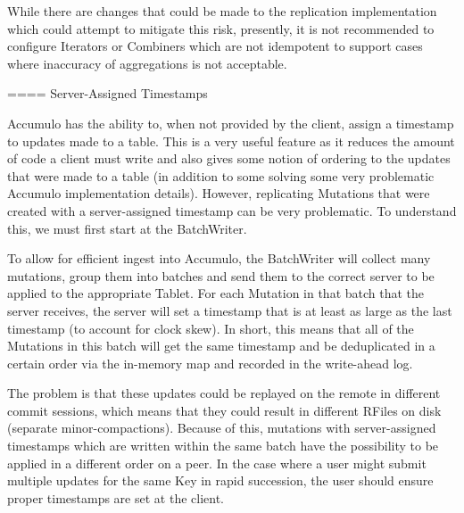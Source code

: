 While there are changes that could be made to the replication implementation which could attempt to mitigate this risk,
presently, it is not recommended to configure Iterators or Combiners which are not idempotent to support cases where
inaccuracy of aggregations is not acceptable.

==== Server-Assigned Timestamps

Accumulo has the ability to, when not provided by the client, assign a timestamp to updates made to a table. This is a
very useful feature as it reduces the amount of code a client must write and also gives some notion of ordering to the
updates that were made to a table (in addition to some solving some very problematic Accumulo implementation details).
However, replicating Mutations that were created with a server-assigned timestamp can be very problematic. To understand
this, we must first start at the BatchWriter.

To allow for efficient ingest into Accumulo, the BatchWriter will collect many mutations, group them into batches and
send them to the correct server to be applied to the appropriate Tablet. For each Mutation in that batch that the server
receives, the server will set a timestamp that is at least as large as the last timestamp (to account for clock skew). In short,
this means that all of the Mutations in this batch will get the same timestamp and be deduplicated in a certain order
via the in-memory map and recorded in the write-ahead log.

The problem is that these updates could be replayed on the remote in different commit sessions, which means that they
could result in different RFiles on disk (separate minor-compactions). Because of this, mutations with server-assigned
timestamps which are written within the same batch have the possibility to be applied in a different order on a peer. In
the case where a user might submit multiple updates for the same Key in rapid succession, the user should ensure proper
timestamps are set at the client.
